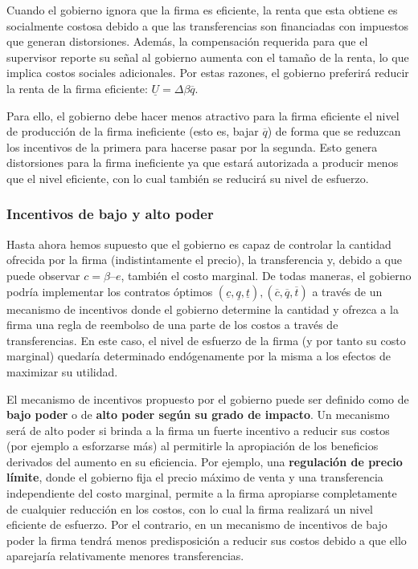 \documentclass[
  12pt,
  spanish,
]{book}
\begin{document}
Cuando el gobierno ignora que la firma es eficiente, la renta que esta
obtiene es socialmente costosa debido a que las transferencias son
financiadas con impuestos que generan distorsiones. Además, la
compensación requerida para que el supervisor reporte su señal al
gobierno aumenta con el tamaño de la renta, lo que implica costos
sociales adicionales. Por estas razones, el gobierno preferirá reducir
la renta de la firma eficiente: \(\underline U = Δβ \overline q\).

Para ello, el gobierno debe hacer menos atractivo para la firma
eficiente el nivel de producción de la firma ineficiente (esto es, bajar
\(\overline q\)) de forma que se reduzcan los incentivos de la primera
para hacerse pasar por la segunda. Esto genera distorsiones para la
firma ineficiente ya que estará autorizada a producir menos que el nivel
eficiente, con lo cual también se reducirá su nivel de esfuerzo.

\hypertarget{incentivos-de-bajo-y-alto-poder}{%
\subsubsection{Incentivos de bajo y alto
poder}\label{incentivos-de-bajo-y-alto-poder}}

Hasta ahora hemos supuesto que el gobierno es capaz de controlar la
cantidad ofrecida por la firma (indistintamente el precio), la
transferencia y, debido a que puede observar \(c = β – e\), también el
costo marginal. De todas maneras, el gobierno podría implementar los
contratos óptimos
\({(\underline c, \underline q, \underline t), (\overline c, \overline q, \overline t)}\)
a través de un mecanismo de incentivos donde el gobierno determine la
cantidad y ofrezca a la firma una regla de reembolso de una parte de los
costos a través de transferencias. En este caso, el nivel de esfuerzo de
la firma (y por tanto su costo marginal) quedaría determinado
endógenamente por la misma a los efectos de maximizar su utilidad.

El mecanismo de incentivos propuesto por el gobierno puede ser definido
como de \textbf{bajo poder} o de \textbf{alto poder según su grado de
impacto}. Un mecanismo será de alto poder si brinda a la firma un fuerte
incentivo a reducir sus costos (por ejemplo a esforzarse más) al
permitirle la apropiación de los beneficios derivados del aumento en su
eficiencia. Por ejemplo, una \textbf{regulación de precio límite}, donde
el gobierno fija el precio máximo de venta y una transferencia
independiente del costo marginal, permite a la firma apropiarse
completamente de cualquier reducción en los costos, con lo cual la firma
realizará un nivel eficiente de esfuerzo. Por el contrario, en un
mecanismo de incentivos de bajo poder la firma tendrá menos
predisposición a reducir sus costos debido a que ello aparejaría
relativamente menores transferencias.
\end{document}
